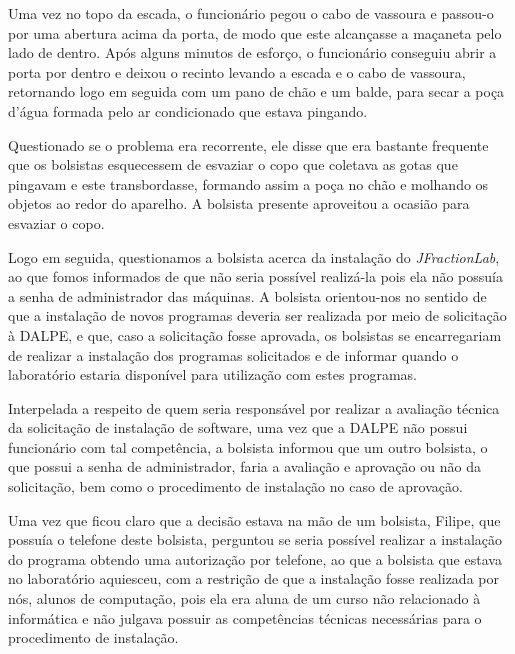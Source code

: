Uma vez no topo da escada, o funcionário pegou o cabo de vassoura e passou-o por uma abertura acima da porta, de modo que este alcançasse a maçaneta pelo lado de dentro. Após alguns minutos de esforço, o funcionário conseguiu abrir a porta por dentro e deixou o recinto levando a escada e o cabo de vassoura, retornando logo em seguida com um pano de chão e um balde, para secar a poça d’água formada pelo ar condicionado que estava pingando.

Questionado se o problema era recorrente, ele disse que era bastante frequente que os bolsistas esquecessem de esvaziar o copo que coletava as gotas que pingavam e este transbordasse, formando assim a poça no chão e molhando os objetos ao redor do aparelho. A bolsista presente aproveitou a ocasião para esvaziar o copo. 


Logo em seguida, questionamos a bolsista acerca da instalação do \textit{JFractionLab}, ao que fomos informados de que não seria possível realizá-la pois ela não possuía a senha de administrador das máquinas. A bolsista orientou-nos no sentido de que a instalação de novos programas deveria ser realizada por meio de solicitação à DALPE, e que, caso a solicitação fosse aprovada, os bolsistas se encarregariam de realizar a instalação dos programas solicitados e de informar quando o laboratório estaria disponível para utilização com estes programas.

Interpelada a respeito de quem seria responsável por realizar a avaliação técnica da solicitação de instalação de software, uma vez que a DALPE não possui funcionário com tal competência, a bolsista informou que um outro bolsista, o que possui a senha de administrador, faria a avaliação e aprovação ou não da solicitação, bem como o procedimento de instalação no caso de aprovação.

Uma vez que ficou claro que a decisão estava na mão de um bolsista, Filipe, que possuía o telefone deste bolsista, perguntou se seria possível realizar a instalação do programa obtendo uma autorização por telefone, ao que a bolsista que estava no laboratório aquiesceu, com a restrição de que a instalação fosse realizada por nós, alunos de computação, pois ela era aluna de um curso não relacionado à informática e não julgava possuir as competências técnicas necessárias para o procedimento de instalação.

